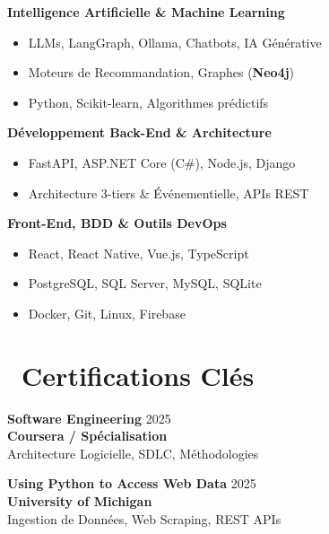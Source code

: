 \documentclass[a4paper,9pt]{extarticle}
\def\faAward{}%
\begin{document}
\begin{minipage}[t]{0.405\textwidth}
  \vspace{2pt}
  {\footnotesize \textbf{\color{accent} Intelligence Artificielle \& Machine Learning}}
  \begin{itemize}
    \item LLMs, LangGraph, Ollama, Chatbots, IA Générative
    \item Moteurs de Recommandation, Graphes (\textbf{Neo4j})
    \item Python, Scikit-learn, Algorithmes prédictifs
  \end{itemize}

  \vspace{2pt}
  {\footnotesize \textbf{\color{accent} Développement Back-End \& Architecture}}
  \begin{itemize}
    \item FastAPI, ASP.NET Core (C\#), Node.js, Django
    \item Architecture 3-tiers \& Événementielle, APIs REST
  \end{itemize}

  \vspace{2pt}
  {\footnotesize \textbf{\color{accent} Front-End, BDD \& Outils DevOps}}
  \begin{itemize}
    \item React, React Native, Vue.js, TypeScript
    \item PostgreSQL, SQL Server, MySQL, SQLite
    \item Docker, Git, Linux, Firebase
  \end{itemize}

  \vspace{3pt}

  \section{\faAward\ Certifications Clés}

  \textbf{\color{primary}\small Software Engineering} \hfill {\scriptsize\color{textmuted} 2025}\\
  {\footnotesize \textbf{Coursera / Spécialisation}}\\
  {\scriptsize\color{textdark} Architecture Logicielle, SDLC, Méthodologies}

  \vspace{2.5pt}
  \textbf{\color{primary}\small Using Python to Access Web Data} \hfill {\scriptsize\color{textmuted} 2025}\\
  {\footnotesize \textbf{University of Michigan}}\\
  {\scriptsize\color{textdark} Ingestion de Données, Web Scraping, REST APIs}


\end{minipage}
\end{document}
